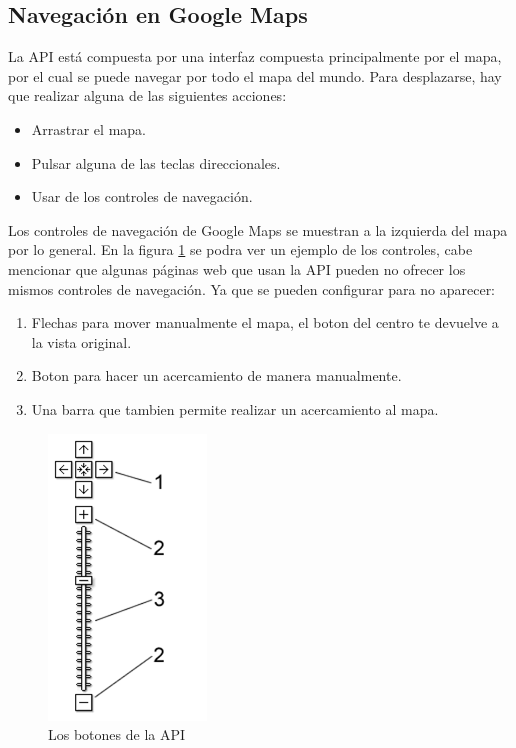 \subsection{Navegación en Google Maps}
        La API está compuesta por una interfaz compuesta principalmente por el mapa,         por el cual se puede navegar por todo el mapa del mundo. Para desplazarse,          hay que realizar alguna de las siguientes acciones:
     \begin{itemize} 
        \item Arrastrar el mapa.
        \item Pulsar alguna de las teclas direccionales.
        \item Usar de los controles de navegación.
     \end{itemize} 
     
      \hspace*{1cm}Los controles de navegación de Google Maps se muestran a la izquierda del mapa por lo general.
En la figura \ref {fig:Cap2_3_1} se podra ver un ejemplo de los controles, cabe mencionar que algunas páginas web que usan la API pueden no ofrecer los mismos controles de navegación. Ya que se pueden configurar para no aparecer:\\
    \begin{enumerate}
      \item Flechas para mover manualmente el mapa, el boton del centro te devuelve             a la vista original.
      \item Boton para hacer un acercamiento de manera manualmente.
      \item Una barra que tambien permite realizar un acercamiento al mapa.
     \end{enumerate} 
     
    \begin{figure}[hbtp]
        \centering
            \includegraphics{Imagenes/Cap2_3_1.png}
            \caption{Los botones de la API}
            \label{fig:Cap2_3_1}
    \end{figure}
    
